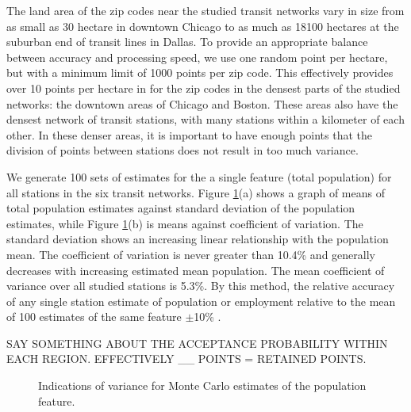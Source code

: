 \documentclass[11pt]{article}
\begin{document}
The land area of the zip codes near the studied transit networks vary in size from as small as 30 hectare in downtown Chicago to as much as 18100 hectares at the suburban end of transit lines in Dallas. To provide an appropriate balance between accuracy and processing speed, we use one random point per hectare, but with a minimum limit of 1000 points per zip code. This effectively provides over 10 points per hectare in for the zip codes in the densest parts of the studied networks: the downtown areas of Chicago and Boston. These areas also have the densest network of transit stations, with many stations within a kilometer of each other. In these denser areas, it is important to have enough points that the division of points between stations does not result in too much variance. 

We generate 100 sets of estimates for the a single feature (total population) for all stations in the six transit networks. Figure \ref{fig:mcvar}(a) shows a graph of means of total population estimates against standard deviation of the population estimates, while Figure \ref{fig:mcvar}(b) is means against coefficient of variation. The standard deviation shows an increasing linear relationship with the population mean. The coefficient of variation is never greater than 10.4\% and generally decreases with increasing estimated mean population. The mean coefficient of variance over all studied stations is 5.3\%. By this method, the relative accuracy of any single station estimate of population or employment relative to the mean of 100 estimates of the same feature $\pm$10\% .

SAY SOMETHING ABOUT THE ACCEPTANCE PROBABILITY WITHIN EACH REGION. EFFECTIVELY \_\_ POINTS = RETAINED POINTS.

\begin{figure}[H]
\centering
{}
\caption{Indications of variance for Monte Carlo estimates of the population feature.}\label{fig:mcvar}
\end{figure}
\end{document}
